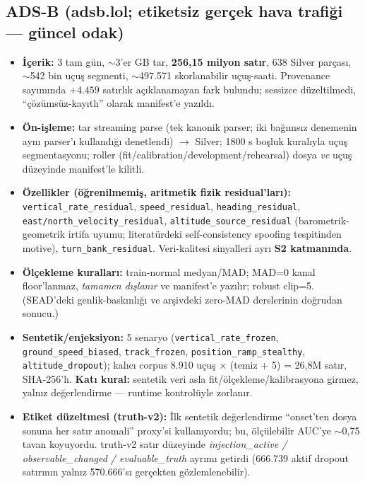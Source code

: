 \documentclass[11pt,a4paper]{article}
\newcommand{\code}[1]{\texttt{\small #1}}
\begin{document}
\subsection{ADS-B (adsb.lol; etiketsiz gerçek hava trafiği --- güncel odak)}
\begin{itemize}[leftmargin=1.2em,itemsep=1pt]
  \item \textbf{İçerik:} 3 tam gün, $\sim$3'er GB tar, \textbf{256{,}15 milyon satır},
  638 Silver parçası, $\sim$542 bin uçuş segmenti, $\sim$497.571 skorlanabilir
  uçuş-saati. Provenance sayımında $+4.459$ satırlık açıklanamayan fark bulundu;
  sessizce düzeltilmedi, ``çözümsüz-kayıtlı'' olarak manifest'e yazıldı.
  \item \textbf{Ön-işleme:} tar streaming parse (tek kanonik parser; iki bağımsız
  denemenin aynı parser'ı kullandığı denetlendi) $\to$ Silver; 1800 s boşluk
  kuralıyla uçuş segmentasyonu; roller (fit/calibration/development/rehearsal)
  dosya \emph{ve} uçuş düzeyinde manifest'le kilitli.
  \item \textbf{Özellikler (öğrenilmemiş, aritmetik fizik residual'ları):}
  \code{vertical\_rate\_residual}, \code{speed\_residual}, \code{heading\_residual},
  \code{east/north\_velocity\_residual}, \code{altitude\_source\_residual}
  (barometrik-geometrik irtifa uyumu; literatürdeki self-consistency spoofing
  tespitinden motive), \code{turn\_bank\_residual}. Veri-kalitesi sinyalleri ayrı
  \textbf{S2 katmanında}.
  \item \textbf{Ölçekleme kuralları:} train-normal medyan/MAD; MAD=0 kanal
  floor'lanmaz, \emph{tamamen dışlanır} ve manifest'e yazılır; robust clip=5.
  (SEAD'deki genlik-baskınlığı ve arşivdeki zero-MAD derslerinin doğrudan sonucu.)
  \item \textbf{Sentetik/enjeksiyon:} 5 senaryo (\code{vertical\_rate\_frozen},
  \code{ground\_speed\_biased}, \code{track\_frozen}, \code{position\_ramp\_stealthy},
  \code{altitude\_dropout}); kalıcı corpus 8.910 uçuş $\times$ (temiz + 5) = 26{,}8M
  satır, SHA-256'lı. \textbf{Katı kural:} sentetik veri asla fit/ölçekleme/kalibrasyona
  girmez, yalnız değerlendirme --- runtime kontrolüyle zorlanır.
  \item \textbf{Etiket düzeltmesi (truth-v2):} İlk sentetik değerlendirme
  ``onset'ten dosya sonuna her satır anomali'' proxy'si kullanıyordu; bu, ölçülebilir
  AUC'ye $\sim$0{,}75 tavan koyuyordu. truth-v2 satır düzeyinde
  \emph{injection\_active / observable\_changed / evaluable\_truth} ayrımı getirdi
  (666.739 aktif dropout satırının yalnız 570.666'sı gerçekten gözlemlenebilir).
\end{itemize}
\end{document}
